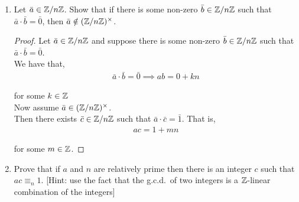 \documentclass[11pt, reqno]{amsart}
\theoremstyle{plain}
\theoremstyle{definition}
\theoremstyle{example}
\def\ZZn{\ZZ/n\ZZ}
\begin{document}
\begin{enumerate}[1.]
\begin{enumerate}
\begin{proof}
We already established that $b \geq 1$, so we have $1 \leq b < n$, or equivalently since $b, n \in \ZZ$, $1 \leq b \leq n-1$.\\

Now note that $\overline{0} = \{0 + kn | k \in \ZZ\}$. We have from (2) that $ab = cn$.\\

Since $c \in \ZZ$, $cn$ satisfies the condition defined for the set $\bar{0}$ and so $cn = ab \in \bar{0}$.\\

Hence, we have
\begin{align*}
\overline{ab} = \bar{0} = \bar{a} \cdot \bar{b}
\end{align*}
\end{proof}

\item Let $\bar{a} \in \ZZn$. Show that if there is some non-zero $\bar{b} \in \ZZn$ such that $\bar{a} \cdot \bar{b} = \bar{0}$, then $\bar{a} \notin (\mathbb{Z}/n\mathbb{Z})^\times$. 


\begin{proof}
Let $\bar{a} \in \ZZn$ and suppose there is some non-zero $\bar{b} \in \ZZn$ such that $\bar{a} \cdot \bar{b} = \bar{0}$.\\

We have that,
\begin{align*}
\bar{a} \cdot \bar{b} = \bar{0} \implies ab = 0 + kn
\end{align*}

for some $k \in \mathbb{Z}$\\

Now assume $\bar{a} \in (\mathbb{Z}/n\mathbb{Z})^\times$.\\

Then there exists $\bar{c} \in \mathbb{Z}/n\mathbb{Z}$ such that $\bar{a} \cdot \bar{c} = \bar{1}$. That is,
\begin{align*}
ac = 1 + mn
\end{align*}

for some $m \in \mathbb{Z}$.
\end{proof}

\item Prove that if $a$ and $n$ are relatively prime then there is an integer $c$ such that $ac \equiv_n 1$. {[Hint: use the fact that the g.c.d.\ of two integers is a $\mathbb{Z}$-linear combination of the integers]}


%
	

\end{enumerate}
\end{enumerate}
\end{document}
